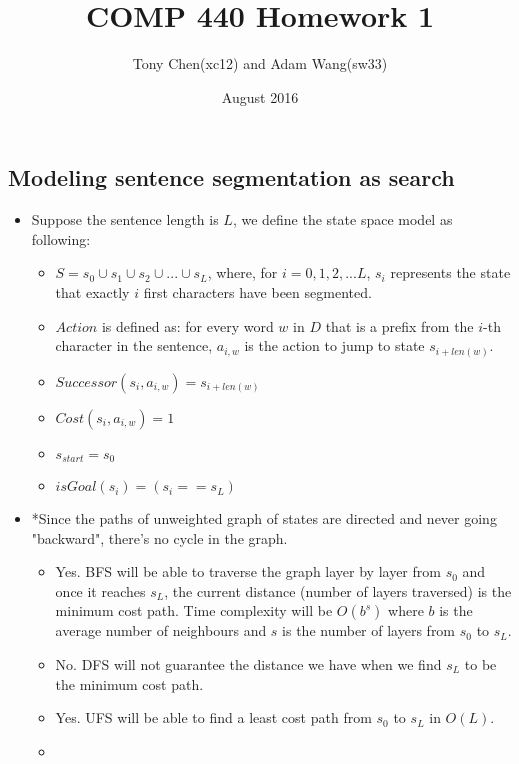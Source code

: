 \documentclass[11pt]{article}
\title{COMP 440 Homework 1}
\author{Tony Chen(xc12) and Adam Wang(sw33)}
\date{August 2016}
\begin{document}
\begin{onehalfspace}
    \maketitle
    \newpage{}
    \section{Modeling sentence segmentation as search}
    \begin{itemize}
        \item
        Suppose the sentence length is $L$, we define the state space model as following:
        \begin{itemize}
            \item
            $S = s_0\cup s_1\cup s_2\cup ... \cup s_L$, where, for $i = 0, 1, 2, ... L$, $s_i$ represents the state that exactly $i$ first characters have been segmented.
            \item
            $Action$ is defined as: for every word $w$ in $D$ that is a prefix from the $i$-th character in the sentence, $a_{i,w}$ is the action to jump to state $s_{i+len(w)}$.
            \item
            $Successor(s_i, a_{i,w}) = s_{i+len(w)}$
            \item
            $Cost(s_i, a_{i,w}) = 1$
            \item
            $s_{start} = s_0$
            \item
            $isGoal(s_i) = (s_i == s_L)$
        \end{itemize}
        \item
        *Since the paths of unweighted graph of states are directed and never going "backward", there's no cycle in the graph.
        \begin{itemize}
            \item
            Yes. BFS will be able to traverse the graph layer by layer from $s_0$ and once it reaches $s_L$, the current distance (number of layers traversed) is the minimum cost path. Time complexity will be $O(b^s)$ where $b$ is the average number of neighbours and $s$ is the number of layers from $s_0$ to $s_L$.
            \item
            No. DFS will not guarantee the distance we have when we find $s_L$ to be the minimum cost path.
            \item
            Yes. UFS will be able to find a least cost path from $s_0$ to $s_L$ in $O(L)$.
            \item

\end{itemize}
\end{itemize}
\end{onehalfspace}
\end{document}
